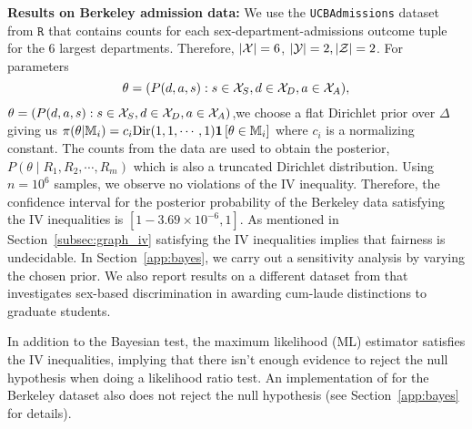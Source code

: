 \noindent\textbf{Results on Berkeley admission data: }We use the \texttt{UCBAdmissions} \citep{UCBAdmissions} dataset from $\texttt{R}$ that contains counts for each sex-department-admissions outcome tuple for the $6$ largest departments. Therefore, $|{\cal X}| = 6$, $|{\cal Y}|=2, |{\cal Z}|=2$. For parameters \ifdefined\SINGLE $$\theta = {\left({ P(d,a,s): s \in {\cal X}_S, d \in {\cal X}_D, a \in {\cal X}_A}\right)},$$ \else $\theta = {\left({ P(d,a,s): s \in {\cal X}_S, d \in {\cal X}_D, a \in {\cal X}_A}\right)}$,\fi we choose a flat Dirichlet prior over $\Delta$ giving us $\pi(\theta | \mathbb{M}_i)= c_i \text{Dir}{\left({1,1,\cdots,1}\right)}\bm{1}\left[ \theta \in \mathbb{M}_i \right]$ where $c_i$ is a normalizing constant. The counts from the data are used to obtain the posterior, $P(\theta \mid R_1, R_2, \cdots, R_m)$ which is also a truncated Dirichlet distribution. Using $n=10^6$ samples, we observe no violations of the IV inequality. Therefore, the confidence interval for the posterior probability of the Berkeley data satisfying the IV inequalities is $\left[1-3.69\times 10^{-6},1\right]$. As mentioned in Section~\ref{subsec:graph_iv} satisfying the IV inequalities implies that fairness is undecidable. In Section~\ref{app:bayes}, we carry out a sensitivity analysis by varying the chosen prior. We also report results on a different dataset from \citet{Bol23} that investigates sex-based discrimination in awarding cum-laude distinctions to graduate students.

In addition to the Bayesian test, the maximum likelihood (ML) estimator satisfies the IV inequalities, implying that there isn't enough evidence to reject the null hypothesis when doing a likelihood ratio test. An implementation of \citet{WangRR17} for the Berkeley dataset also does not reject the null hypothesis (see Section~\ref{app:bayes} for details).


